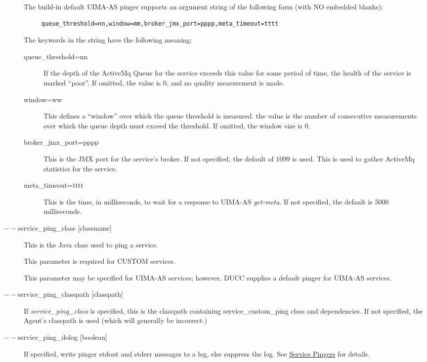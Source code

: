 \begin{description}
        The build-in default UIMA-AS pinger supports an argument string of the following form
        (with NO embedded blanks):
\begin{verbatim}
     queue_threshold=nn,window=mm,broker_jmx_port=pppp,meta_timeout=tttt
\end{verbatim}
        
        The keywords in the string have the following meaning:
        \begin{description}
          \item[queue\_threshold=nn] If the depth of the ActiveMq Queue for the service exceeds
            this value for some period of time, the health of the service is marked ``poor''.
            If omitted, the value is 0, and no quality measurement is made.
          \item[window=ww] This defines a ``window'' over which the queue threshold is measured.
            the value is the number of consecutive measurements over which the queue depth must
            exceed the threshold.  If omitted, the window size is 0.
          \item[broker\_jmx\_port=pppp] This is the JMX port for the service's broker.  If not
            specified, the default of 1099 is used.  This is used to gather ActiveMq statistics
            for the service.
          \item[meta\_timeout=tttt] This is the time, in milliseconds, to wait for a response
            to UIMA-AS {\em get-meta}.  If not specified, the default is 5000 milliseconds.
        \end{description}
      
      \item[$--$service\_ping\_class {[classname]}] This is the Java class used to ping a service. 

        This parameter is required for CUSTOM services.

        This parameter may be specified for UIMA-AS services; however, DUCC supplies a default
        pinger for UIMA-AS services.

      \item[$--$service\_ping\_classpath {[classpath]}] If {\em service\_ping\_class} is specified,
        this is the classpath containing service\_custom\_ping class and dependencies.  If not
        specified, the Agent's classpath is used (which will generally be incorrect.)

      \item[$--$service\_ping\_dolog {[boolean]}] If specified, write pinger stdout and stderr
        messages to a log, else suppress the log. See \hyperref[sec:service.pingers]{Service Pingers}
        for details.


\end{description}
